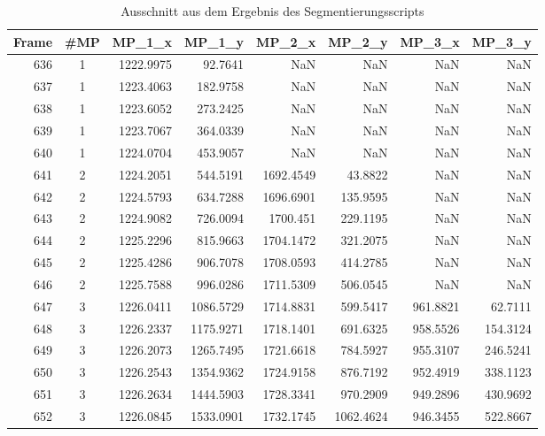 \begin{table}[]
    \caption{Ausschnitt aus dem Ergebnis des Segmentierungsscripts}
	\small
	\centering
    \begin{tabular}{@{}rcrrrrrr@{}}
    \toprule
    Frame   & \#MP & MP\_1\_x  & MP\_1\_y  & MP\_2\_x  & MP\_2\_y  & MP\_3\_x & MP\_3\_y \\ \midrule
    636     & 1    & 1222.9975 & 92.7641   & NaN       & NaN       & NaN      & NaN      \\
    637     & 1    & 1223.4063 & 182.9758  & NaN       & NaN       & NaN      & NaN      \\
    638     & 1    & 1223.6052 & 273.2425  & NaN       & NaN       & NaN      & NaN      \\
    639     & 1    & 1223.7067 & 364.0339  & NaN       & NaN       & NaN      & NaN      \\
    640     & 1    & 1224.0704 & 453.9057  & NaN       & NaN       & NaN      & NaN      \\
    641     & 2    & 1224.2051 & 544.5191  & 1692.4549 & 43.8822   & NaN      & NaN      \\
    642     & 2    & 1224.5793 & 634.7288  & 1696.6901 & 135.9595  & NaN      & NaN      \\
    643     & 2    & 1224.9082 & 726.0094  & 1700.451  & 229.1195  & NaN      & NaN      \\
    644     & 2    & 1225.2296 & 815.9663  & 1704.1472 & 321.2075  & NaN      & NaN      \\
    645     & 2    & 1225.4286 & 906.7078  & 1708.0593 & 414.2785  & NaN      & NaN      \\
    646     & 2    & 1225.7588 & 996.0286  & 1711.5309 & 506.0545  & NaN      & NaN      \\
    647     & 3    & 1226.0411 & 1086.5729 & 1714.8831 & 599.5417  & 961.8821 & 62.7111  \\
    648     & 3    & 1226.2337 & 1175.9271 & 1718.1401 & 691.6325  & 958.5526 & 154.3124 \\
    649     & 3    & 1226.2073 & 1265.7495 & 1721.6618 & 784.5927  & 955.3107 & 246.5241 \\
    650     & 3    & 1226.2543 & 1354.9362 & 1724.9158 & 876.7192  & 952.4919 & 338.1123 \\
    651     & 3    & 1226.2634 & 1444.5903 & 1728.3341 & 970.2909  & 949.2896 & 430.9692 \\
    652     & 3    & 1226.0845 & 1533.0901 & 1732.1745 & 1062.4624 & 946.3455 & 522.8667 \\

\end{tabular}
\end{table}
